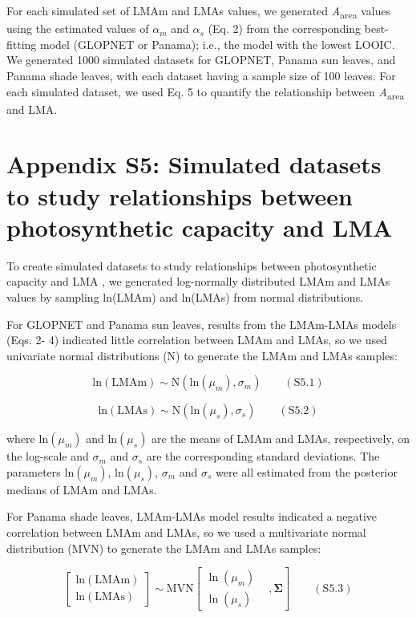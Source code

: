 \documentclass[
  12pt,
  letterpaper,
  DIV=11,
  numbers=noendperiod]{scrartcl}
\begin{document}
For each simulated set of LMAm and LMAs values, we generated
\emph{A}\textsubscript{area} values using the estimated values of
\(\alpha_m\) and \(\alpha_s\) (Eq. 2) from the corresponding
best-fitting model (GLOPNET or Panama); i.e., the model with the lowest
LOOIC. We generated 1000 simulated datasets for GLOPNET, Panama sun
leaves, and Panama shade leaves, with each dataset having a sample size
of 100 leaves. For each simulated dataset, we used Eq. 5 to quantify the
relationship between \emph{A}\textsubscript{area} and LMA.

\hypertarget{appendix-s5-simulated-datasets-to-study-relationships-between-photosynthetic-capacity-and-lma}{%
\section{Appendix S5: Simulated datasets to study relationships between
photosynthetic capacity and
LMA}\label{appendix-s5-simulated-datasets-to-study-relationships-between-photosynthetic-capacity-and-lma}}

To create simulated datasets to study relationships between
photosynthetic capacity and LMA , we generated log-normally distributed
LMAm and LMAs values by sampling ln(LMAm) and ln(LMAs) from normal
distributions.

For GLOPNET and Panama sun leaves, results from the LMAm-LMAs models
(Eqs. 2- 4) indicated little correlation between LMAm and LMAs, so we
used univariate normal distributions (N) to generate the LMAm and LMAs
samples:

\[
\mathrm{ln}(\mathrm{LMAm}) \sim \mathrm{N}(\mathrm{ln}(\mu_m), \sigma_m) \qquad(\mathrm{S}5.1)
\]

\[
\mathrm{ln}(\mathrm{LMAs}) \sim \mathrm{N}(\mathrm{ln}(\mu_s), \sigma_s) \qquad(\mathrm{S}5.2)
\]

where \(\mathrm{ln}(\mu_m)\) and \(\mathrm{ln}(\mu_s)\) are the means of
LMAm and LMAs, respectively, on the log-scale and \(\sigma_m\) and
\(\sigma_s\) are the corresponding standard deviations. The parameters
\(\mathrm{ln}(\mu_m)\), \(\mathrm{ln}(\mu_s)\), \(\sigma_m\) and
\(\sigma_s\) were all estimated from the posterior medians of LMAm and
LMAs.

For Panama shade leaves, LMAm-LMAs model results indicated a negative
correlation between LMAm and LMAs, so we used a multivariate normal
distribution (MVN) to generate the LMAm and LMAs samples:

\[
\begin{bmatrix}
\mathrm{ln}(\mathrm{LMAm})\\
\mathrm{ln}(\mathrm{LMAs})
\end{bmatrix}
\sim \mathrm{MVN}
\left[
\begin{matrix}
\ln(\mu_{m}) &\\
\ln(\mu_{s}) &
\end{matrix},
\boldsymbol{\Sigma}
\right] \qquad(\mathrm{S}5.3)
\]
\end{document}
